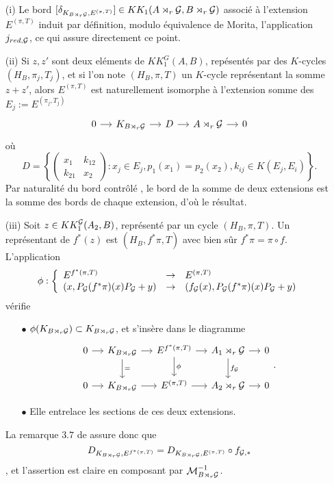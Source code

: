 \begin{dem}
\begin{enumerate}

\item[(i)] Le bord $[\delta_{K_{B\rtimes_r \mathcal G},E^{(\pi,T)}}]\in KK_1(A\rtimes_r \mathcal G, B\rtimes_r \mathcal G)$ associé à l'extension $E^{(\pi,T)}$ induit par définition, modulo équivalence de Morita, l'application $j_{red,\mathcal G}$, ce qui assure directement ce point.

\item[(ii)] Si $z,z'$ sont deux eléments de $KK_1^G(A,B)$, repésentés par des $K$-cycles $(H_B,\pi_j,T_j)$, et si l'on note $(H_B,\pi,T)$ un $K$-cycle représentant la somme $z+z'$, alors $E^{(\pi,T)}$ est naturellement isomorphe à l'extension somme des $E_j:=E^{(\pi_j,T_j)}$
\[\begin{tikzcd}[column sep = small]
0\arrow{r} & K_{B\rtimes_r \G} \arrow{r} & D \arrow{r} & A\rtimes_r \G \arrow{r} & 0
\end{tikzcd}\]
où 
\[D=\left\{\begin{pmatrix}x_1 & k_{12}\\ k_{21} & x_2\end{pmatrix} : x_j\in E_j , p_1(x_1)=p_2(x_2), k_{ij}\in K(E_j,E_i)\right\}.\]
Par naturalité du bord contrôlé \cite{OY2}, le bord de la somme de deux extensions est la somme des bords de chaque extension, d'où le résultat.
\item[(iii)] Soit $z\in KK_1^\mathcal G(A_2,B)$, représenté par un cycle $(H_B,\pi,T)$. Un représentant de $f^*(z)$ est $(H_B,f^*\pi,T)$ avec bien sûr $f^*\pi=\pi \circ f$. L'application 
\[\phi : \left\{\begin{array}{lll} E^{f^*(\pi,T)} & \rightarrow & E^{(\pi,T)} \\
( x, P_\mathcal G(f^*\pi)(x)P_\mathcal G+y) & \rightarrow & ( f_\mathcal G(x), P_\mathcal G(f^*\pi)(x)P_\mathcal G+y) \end{array}\right. \]
vérifie
\begin{enumerate}
\item[$\bullet$] $\phi(K_{B\rtimes_r \mathcal G})\subset K_{B\rtimes_r \mathcal G}$, et s'insère dans le diagramme
\[\begin{tikzcd}[column sep = small]
0\arrow{r} & K_{B\rtimes_r \G}\arrow{r}\arrow{d}{=} & E^{f^*(\pi,T)} \arrow{r}\arrow{d}{\phi}& A_1\rtimes_r \G\arrow{r}\arrow{d}{f_\G} & 0\\
0\arrow{r} & K_{B\rtimes_r \G}\arrow{r} & E^{(\pi,T)} \arrow{r}& A_2\rtimes_r \G\arrow{r} & 0
\end{tikzcd}.\]
\item[$\bullet$] Elle entrelace les sections de ces deux extensions.
\end{enumerate}
La remarque $3.7$ de \cite{OY2} assure donc que \[D_{K_{B\rtimes_r \mathcal G}, E^{f^*(\pi,T)} } =  D_{K_{B\rtimes_r \mathcal G}, E^{(\pi,T)} }\circ f_{\mathcal G,*}\], et l'assertion est claire en composant par $\mathcal M_{B\rtimes_r \mathcal G}^{-1}$.


\end{enumerate}
\end{dem}
